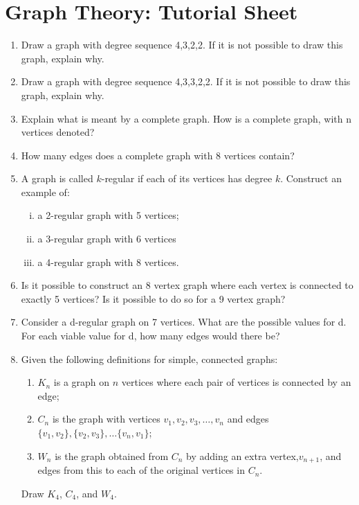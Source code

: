 \documentclass[]{article}
\begin{document}
\section*{Graph Theory: Tutorial Sheet}
\begin{enumerate}
\item Draw a graph with degree sequence 4,3,2,2. If it is not possible to draw this graph, explain why.
\item Draw a graph with degree sequence 4,3,3,2,2. If it is not possible to draw this graph, explain why.
\item Explain what is meant by a complete graph. How is a complete graph, with n vertices denoted?
\item How many edges does a complete graph with 8 vertices contain?
\item A graph is called $k$-regular if each of its vertices has degree $k$. Construct an 
example of: 
\begin{enumerate}[(i)]

\item a 2-regular graph with 5 vertices; 
\item a 3-regular graph with 6 vertices
\item a 4-regular graph with 8 vertices.
\end{enumerate}

\item Is it possible to construct an 8 vertex graph where each vertex is connected to exactly 5 vertices? Is it possible to do so for a 9 vertex graph?
\item Consider a d-regular graph on 7 vertices. What are the possible values for d. For each viable value for d, how many edges would there be?

\item 
Given the following definitions for simple, connected graphs:
\begin{enumerate}
\item $K_n$ is a graph on $n$ vertices where each pair of vertices is connected by an edge;
\item $C_n$ is the graph with vertices $v_1, v_2, v_3, \dots, v_n$ and edges $\{v_1,v_2\}, \{v_2,v_3\}, \dots\{v_n, v_1\}$;
\item $W_n$ is the graph obtained from $C_n$ by adding an extra vertex,$v_{n+1}$, and edges
from this to each of the original vertices in $C_n$.
\end{enumerate}
Draw $K_4$, $C_4$, and $W_4$. 



\end{enumerate}
\end{document}

